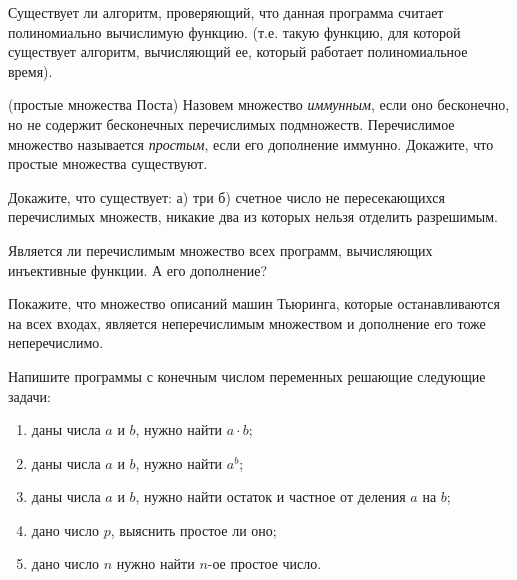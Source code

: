 \setcounter{curtask}{17}


\begin{task}
    Существует ли алгоритм, проверяющий, что данная программа считает полиномиально вычислимую функцию. (т.е. такую функцию, для
    которой существует алгоритм, вычисляющий ее, который работает полиномиальное время).
\end{task}

\begin{task} (простые множества Поста)
    Назовем множество {\it иммунным}, если оно бесконечно, но не содержит бесконечных перечислимых подмножеств. Перечислимое
    множество называется {\it простым}, если его дополнение иммунно. Докажите, что простые множества существуют.
\end{task}

\begin{task}
    Докажите, что существует: а) три б) счетное число не пересекающихся перечислимых множеств, никакие два из которых нельзя
    отделить разрешимым. 
\end{task}

\begin{task}
    Является ли перечислимым множество всех программ, вычисляющих инъективные функции. А его дополнение?
\end{task}



\breakline


\begin{ptask}{14}
    Покажите, что множество описаний машин Тьюринга, которые останавливаются на всех входах, является неперечислимым множеством и
    дополнение его тоже неперечислимо.
\end{ptask}

\begin{ptask}{16}
	Напишите программы с конечным числом переменных решающие следующие задачи:
	\begin{enumerate}
		\item даны числа $a$ и $b$, нужно найти $a \cdot b$;
		\item даны числа $a$ и $b$, нужно найти $a^b$;
		\item даны числа $a$ и $b$, нужно найти остаток и частное от деления $a$ на $b$;
		\item дано число $p$, выяснить простое ли оно;
		\item дано число $n$ нужно найти $n$-ое простое число.
	\end{enumerate}
\end{ptask}